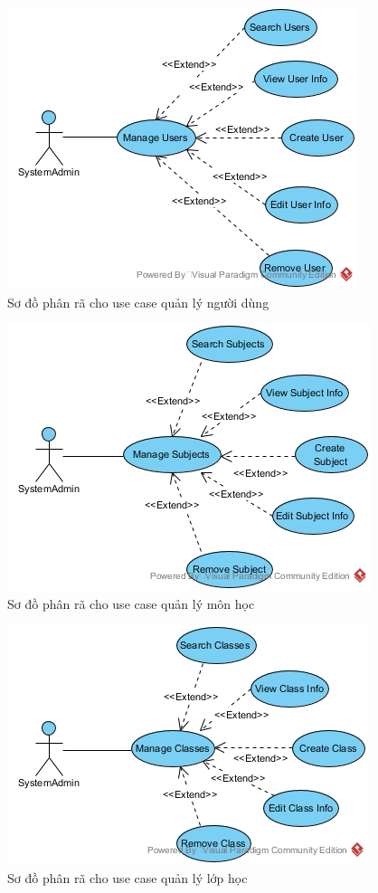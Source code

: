 \documentclass{article}
\begin{document}
  \begin{figure}[!htb]
    \centering
    \includegraphics[scale=0.5]{../pictures/projectdiagrams/Manage-Users-uc-desctructing.jpg}
    \caption{Sơ đồ phân rã cho use case quản lý người dùng}
  \end{figure}

  \begin{figure}[!htb]
    \centering
    \includegraphics[scale=0.5]{../pictures/projectdiagrams/Manage-Subjects-uc-desctructing.jpg}
    \caption{Sơ đồ phân rã cho use case quản lý môn học}
  \end{figure}

  \begin{figure}[!htb]
    \centering
    \includegraphics[scale=0.5]{../pictures/projectdiagrams/Manage-Classes-uc-destructing.jpg}
    \caption{Sơ đồ phân rã cho use case quản lý lớp học}
  \end{figure}
\end{document}
